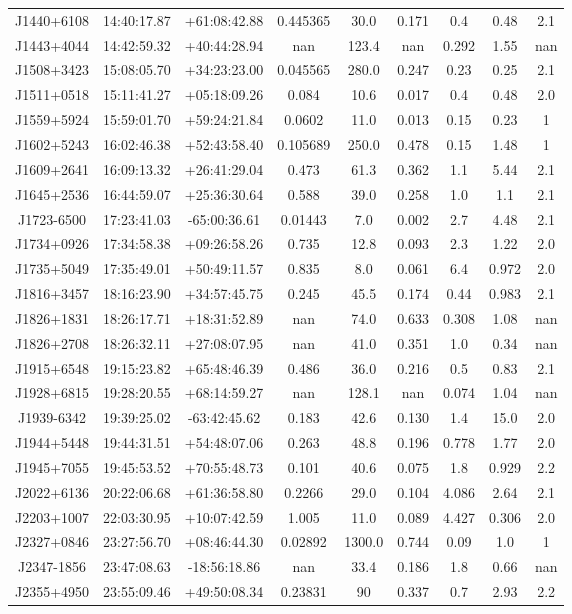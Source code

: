 \begin{table}[H]
\begin{tabular}{@{}ccccccccc@{}}
        J1440+6108 & 14:40:17.87 & +61:08:42.88 & 0.445365 & 30.0 & 0.171 & 0.4 & 0.48 & 2.1 \\
        J1443+4044 & 14:42:59.32 & +40:44:28.94 & nan & 123.4 & nan & 0.292 & 1.55 & nan \\
        J1508+3423 & 15:08:05.70 & +34:23:23.00 & 0.045565 & 280.0 & 0.247 & 0.23 & 0.25 & 2.1 \\
        J1511+0518 & 15:11:41.27 & +05:18:09.26 & 0.084 & 10.6 & 0.017 & 0.4 & 0.48 & 2.0 \\
        J1559+5924 & 15:59:01.70 & +59:24:21.84 & 0.0602 & 11.0 & 0.013 & 0.15 & 0.23 & 1 \\
        J1602+5243 & 16:02:46.38 & +52:43:58.40 & 0.105689 & 250.0 & 0.478 & 0.15 & 1.48 & 1 \\
        J1609+2641 & 16:09:13.32 & +26:41:29.04 & 0.473 & 61.3 & 0.362 & 1.1 & 5.44 & 2.1 \\
        J1645+2536 & 16:44:59.07 & +25:36:30.64 & 0.588 & 39.0 & 0.258 & 1.0 & 1.1 & 2.1 \\
        J1723-6500 & 17:23:41.03 & -65:00:36.61 & 0.01443 & 7.0 & 0.002 & 2.7 & 4.48 & 2.1 \\
        J1734+0926 & 17:34:58.38 & +09:26:58.26 & 0.735 & 12.8 & 0.093 & 2.3 & 1.22 & 2.0 \\
        J1735+5049 & 17:35:49.01 & +50:49:11.57 & 0.835 & 8.0 & 0.061 & 6.4 & 0.972 & 2.0 \\
        J1816+3457 & 18:16:23.90 & +34:57:45.75 & 0.245 & 45.5 & 0.174 & 0.44 & 0.983 & 2.1 \\
        J1826+1831 & 18:26:17.71 & +18:31:52.89 & nan & 74.0 & 0.633 & 0.308 & 1.08 & nan \\
        J1826+2708 & 18:26:32.11 & +27:08:07.95 & nan & 41.0 & 0.351 & 1.0 & 0.34 & nan \\
        J1915+6548 & 19:15:23.82 & +65:48:46.39 & 0.486 & 36.0 & 0.216 & 0.5 & 0.83 & 2.1 \\
        J1928+6815 & 19:28:20.55 & +68:14:59.27 & nan & 128.1 & nan & 0.074 & 1.04 & nan \\
        J1939-6342 & 19:39:25.02 & -63:42:45.62 & 0.183 & 42.6 & 0.130 & 1.4 & 15.0 & 2.0 \\
        J1944+5448 & 19:44:31.51 & +54:48:07.06 & 0.263 & 48.8 & 0.196 & 0.778 & 1.77 & 2.0 \\
        J1945+7055 & 19:45:53.52 & +70:55:48.73 & 0.101 & 40.6 & 0.075 & 1.8 & 0.929 & 2.2 \\
        J2022+6136 & 20:22:06.68 & +61:36:58.80 & 0.2266 & 29.0 & 0.104 & 4.086 & 2.64 & 2.1 \\
        J2203+1007 & 22:03:30.95 & +10:07:42.59 & 1.005 & 11.0 & 0.089 & 4.427 & 0.306 & 2.0 \\
        J2327+0846 & 23:27:56.70 & +08:46:44.30 & 0.02892 & 1300.0 & 0.744 & 0.09 & 1.0 & 1 \\
        J2347-1856 & 23:47:08.63 & -18:56:18.86 & nan & 33.4 & 0.186 & 1.8 & 0.66 & nan \\
        J2355+4950 & 23:55:09.46 & +49:50:08.34 & 0.23831 & 90 & 0.337 & 0.7 & 2.93 & 2.2 \\
        \bottomrule


\end{tabular}
\end{table}
